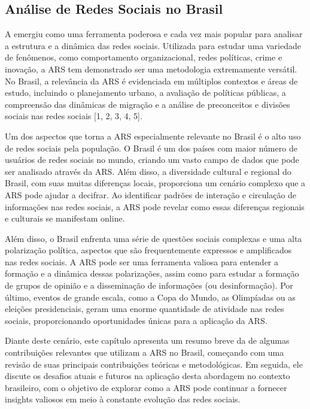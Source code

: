 \subsection*{Análise de Redes Sociais no Brasil}

A  emergiu como uma ferramenta poderosa e cada vez mais popular para analisar a estrutura e a dinâmica das redes sociais. Utilizada para estudar uma variedade de fenômenos, como comportamento organizacional, redes políticas, crime e inovação, a ARS tem demonstrado ser uma metodologia extremamente versátil. No Brasil, a relevância da ARS é evidenciada em múltiplos contextos e áreas de estudo, incluindo o planejamento urbano, a avaliação de políticas públicas, a compreensão das dinâmicas de migração e a análise de preconceitos e divisões sociais nas redes sociais [1, 2, 3, 4, 5].

Um dos aspectos que torna a {ARS} especialmente relevante no Brasil é o alto uso de redes sociais pela população. O Brasil é um dos países com maior número de usuários de redes sociais no mundo, criando um vasto campo de dados que pode ser analisado através da {ARS}. Além disso, a diversidade cultural e regional do Brasil, com suas muitas diferenças locais, proporciona um cenário complexo que a ARS pode ajudar a decifrar. Ao identificar padrões de interação e circulação de informações nas redes sociais, a ARS pode revelar como essas diferenças regionais e culturais se manifestam online.

Além disso, o Brasil enfrenta uma série de questões sociais complexas e uma alta polarização política, aspectos que são frequentemente expressos e amplificados nas redes sociais. A ARS pode ser uma ferramenta valiosa para entender a formação e a dinâmica dessas polarizações, assim como para estudar a formação de grupos de opinião e a disseminação de informações (ou desinformação). Por último, eventos de grande escala, como a Copa do Mundo, as Olimpíadas ou as eleições presidenciais, geram uma enorme quantidade de atividade nas redes sociais, proporcionando oportunidades únicas para a aplicação da ARS.

Diante deste cenário, este capítulo apresenta um resumo breve da de algumas contribuições relevantes que utilizam a ARS no Brasil, começando com uma revisão de suas principais contribuições teóricas e metodológicas. Em seguida, ele discute os desafios atuais e futuros na aplicação desta abordagem no contexto brasileiro, com o objetivo de explorar como a ARS pode continuar a fornecer insights valiosos em meio à constante evolução das redes sociais.

